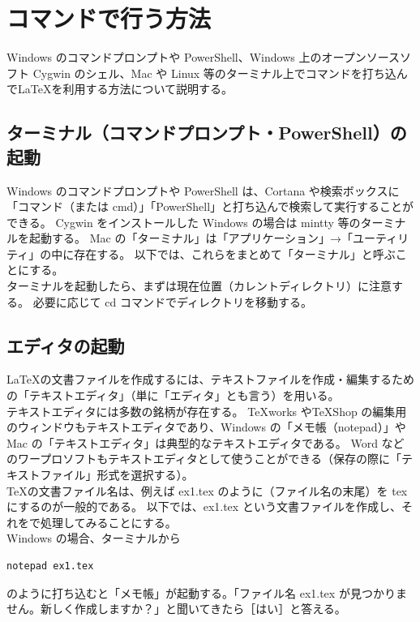 \section{コマンドで行う方法}
Windows のコマンドプロンプトや PowerShell、Windows 上のオープンソースソフト Cygwin のシェル、Mac や Linux 等のターミナル上でコマンドを打ち込んで\LaTeX{}を利用する方法について説明する。
\subsection{ターミナル（コマンドプロンプト・PowerShell）の起動}
Windows のコマンドプロンプトや PowerShell は、Cortana や検索ボックスに「コマンド（または cmd）」「PowerShell」と打ち込んで検索して実行することができる。
Cygwin をインストールした Windows の場合は mintty 等のターミナルを起動する。
Mac の「ターミナル」は「アプリケーション」→「ユーティリティ」の中に存在する。
以下では、これらをまとめて「ターミナル」と呼ぶことにする。\\

ターミナルを起動したら、まずは現在位置（カレントディレクトリ）に注意する。
必要に応じて cd コマンドでディレクトリを移動する。
\subsection{エディタの起動}
\LaTeX{}の文書ファイルを作成するには、テキストファイルを作成・編集するための「テキストエディタ」（単に「エディタ」とも言う）を用いる。\\

テキストエディタには多数の銘柄が存在する。
\TeX{}works や\TeX{}Shop の編集用のウィンドウもテキストエディタであり、Windows の「メモ帳（notepad）」や Mac の「テキストエディタ」は典型的なテキストエディタである。
Word などのワープロソフトもテキストエディタとして使うことができる（保存の際に「テキストファイル」形式を選択する）。\\

\TeX{}の文書ファイル名は、例えば ex1.tex のように（ファイル名の末尾）を tex にするのが一般的である。
以下では、ex1.tex という文書ファイルを作成し、それを\pLaTeX{}で処理してみることにする。\\

Windows の場合、ターミナルから
\begin{mdframed}[roundcorner=0.50zw,leftmargin=3.00zw,rightmargin=3.00zw,skipabove=0.40zw,skipbelow=0.40zw,innertopmargin=4.00pt,innerbottommargin=4.00pt,innerleftmargin=5.00pt,innerrightmargin=5.00pt,linecolor=gray!090,linewidth=0.50pt,backgroundcolor=gray!90]\color{gray!10}
\begin{verbatim}
notepad ex1.tex
\end{verbatim}
\end{mdframed}
のように打ち込むと「メモ帳」が起動する。「ファイル名 ex1.tex が見つかりません。新しく作成しますか？」と聞いてきたら［はい］と答える。\\

